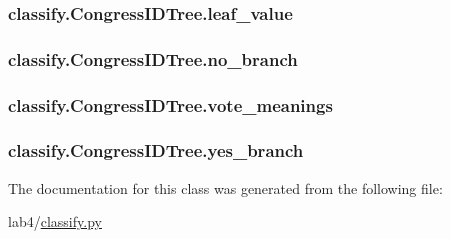 \subsubsection[{leaf\+\_\+value}]{\setlength{\rightskip}{0pt plus 5cm}classify.\+Congress\+I\+D\+Tree.\+leaf\+\_\+value}\label{classclassify_1_1_congress_i_d_tree_a2ef509083aae6cd2234fcfb2f5960647}
\hypertarget{classclassify_1_1_congress_i_d_tree_ab5876f6ca83b38302484f1402d94f39b}{}
\subsubsection[{no\+\_\+branch}]{\setlength{\rightskip}{0pt plus 5cm}classify.\+Congress\+I\+D\+Tree.\+no\+\_\+branch}\label{classclassify_1_1_congress_i_d_tree_ab5876f6ca83b38302484f1402d94f39b}
\hypertarget{classclassify_1_1_congress_i_d_tree_a00eafbcac363d4bfdc21c9923c8e0197}{}
\subsubsection[{vote\+\_\+meanings}]{\setlength{\rightskip}{0pt plus 5cm}classify.\+Congress\+I\+D\+Tree.\+vote\+\_\+meanings}\label{classclassify_1_1_congress_i_d_tree_a00eafbcac363d4bfdc21c9923c8e0197}
\hypertarget{classclassify_1_1_congress_i_d_tree_af434937bd6183942874cccaee8a7c2aa}{}
\subsubsection[{yes\+\_\+branch}]{\setlength{\rightskip}{0pt plus 5cm}classify.\+Congress\+I\+D\+Tree.\+yes\+\_\+branch}\label{classclassify_1_1_congress_i_d_tree_af434937bd6183942874cccaee8a7c2aa}


The documentation for this class was generated from the following file\+:\begin{DoxyCompactItemize}
\item 
lab4/\hyperlink{classify_8py}{classify.\+py}\end{DoxyCompactItemize}
